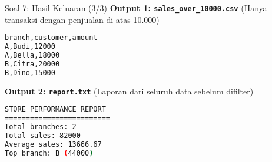 \documentclass[aspectratio=169, table]{beamer}
\begin{document}
\begin{frame}[fragile]{Soal 7: Hasil Keluaran (3/3)}
\vspace{20pt}
\textbf{Output 1: \texttt{sales\_over\_10000.csv}}  
(Hanya transaksi dengan penjualan di atas 10.000)
\begin{lstlisting}[language=bash,basicstyle=\ttfamily\small]
branch,customer,amount
A,Budi,12000
A,Bella,18000
B,Citra,20000
B,Dino,15000
\end{lstlisting}

\textbf{Output 2: \texttt{report.txt}}  
(Laporan dari seluruh data sebelum difilter)
\begin{lstlisting}[language=bash,basicstyle=\ttfamily\small]
STORE PERFORMANCE REPORT
=========================
Total branches: 2
Total sales: 82000
Average sales: 13666.67
Top branch: B (44000)
\end{lstlisting}
\end{frame}
\end{document}
